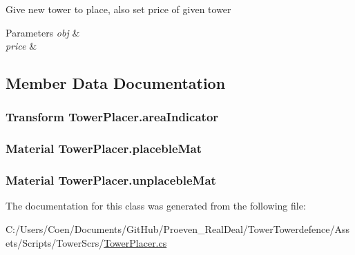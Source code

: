 Give new tower to place, also set price of given tower 


\begin{DoxyParams}{Parameters}
{\em obj} & \\
\hline
{\em price} & \\
\hline
\end{DoxyParams}


\subsection{Member Data Documentation}
\subsubsection[{\texorpdfstring{area\+Indicator}{areaIndicator}}]{\setlength{\rightskip}{0pt plus 5cm}Transform Tower\+Placer.\+area\+Indicator}\hypertarget{class_tower_placer_ac19b108a566462b29ddc0c6a1e7f7a5c}{}\label{class_tower_placer_ac19b108a566462b29ddc0c6a1e7f7a5c}
\subsubsection[{\texorpdfstring{placeble\+Mat}{placebleMat}}]{\setlength{\rightskip}{0pt plus 5cm}Material Tower\+Placer.\+placeble\+Mat}\hypertarget{class_tower_placer_ae1ee6253b5c919130e787de59c4a1aaf}{}\label{class_tower_placer_ae1ee6253b5c919130e787de59c4a1aaf}
\subsubsection[{\texorpdfstring{unplaceble\+Mat}{unplacebleMat}}]{\setlength{\rightskip}{0pt plus 5cm}Material Tower\+Placer.\+unplaceble\+Mat}\hypertarget{class_tower_placer_ae2bf23453504bf245d2e03ce89ae587e}{}\label{class_tower_placer_ae2bf23453504bf245d2e03ce89ae587e}


The documentation for this class was generated from the following file\+:\begin{DoxyCompactItemize}
\item 
C\+:/\+Users/\+Coen/\+Documents/\+Git\+Hub/\+Proeven\+\_\+\+Real\+Deal/\+Tower\+Towerdefence/\+Assets/\+Scripts/\+Tower\+Scr\textquotesingle{}s/\hyperlink{_tower_placer_8cs}{Tower\+Placer.\+cs}\end{DoxyCompactItemize}
